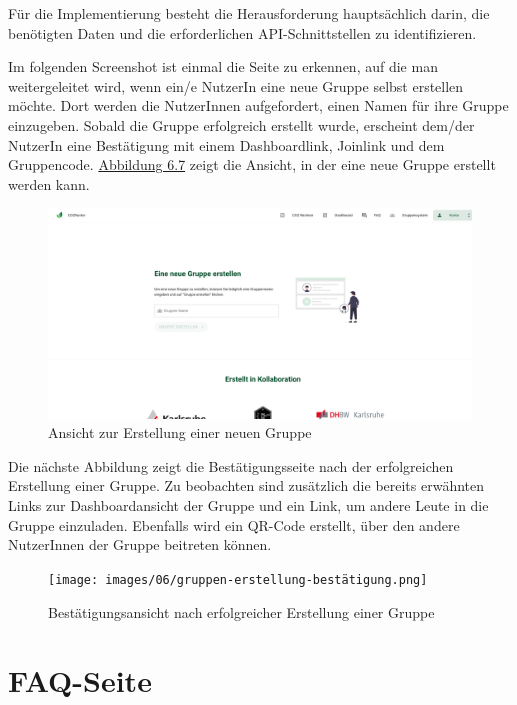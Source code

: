 Für die Implementierung besteht die Herausforderung hauptsächlich darin, die benötigten Daten und die erforderlichen \acs{API}-Schnittstellen zu identifizieren.

Im folgenden Screenshot ist einmal die Seite zu erkennen, auf die man weitergeleitet wird, wenn ein/e NutzerIn eine neue Gruppe selbst erstellen möchte. Dort werden die NutzerInnen aufgefordert, einen Namen für ihre Gruppe einzugeben. Sobald die Gruppe erfolgreich erstellt wurde, erscheint dem/der NutzerIn eine Bestätigung mit einem Dashboardlink, Joinlink und dem Gruppencode. \hyperref[fig:neue-gruppe-design]{Abbildung 6.7} zeigt die Ansicht, in der eine neue Gruppe erstellt werden kann.

\begin{figure}[H]
    \centering
    \includegraphics[width=1\textwidth]{images/06/gruppe-erstellen-design.png}
    \caption{Ansicht zur Erstellung einer neuen Gruppe}
    \label{fig:neue-gruppe-design}
\end{figure}

Die nächste Abbildung zeigt die Bestätigungsseite nach der erfolgreichen Erstellung einer Gruppe. Zu beobachten sind zusätzlich die bereits erwähnten Links zur Dashboardansicht der Gruppe und ein Link, um andere Leute in die Gruppe einzuladen. Ebenfalls wird ein QR-Code erstellt, über den andere NutzerInnen der Gruppe beitreten können.

\begin{figure}[H]
    \centering
    \texttt{[image: images/06/gruppen-erstellung-bestätigung.png]}
    \caption{Bestätigungsansicht nach erfolgreicher Erstellung einer Gruppe}
    \label{fig:gruppe-erfolgreich-erstellt}
\end{figure}

\section{FAQ-Seite}

